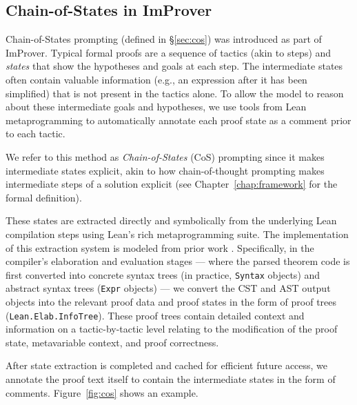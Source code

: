 \subsection{Chain-of-States in ImProver}
\label{ssec:improver_cos}

Chain-of-States prompting (defined in \S\ref{sec:cos}) was introduced as part of ImProver. Typical formal proofs are a sequence of tactics (akin to steps) and \textit{states} that show the hypotheses and goals at each step. The intermediate states often contain valuable information (e.g., an expression after it has been simplified) that is not present in the tactics alone. To allow the model to reason about these intermediate goals and hypotheses, we use tools from Lean metaprogramming to automatically annotate each proof state as a comment prior to each tactic.

We refer to this method as \textit{Chain-of-States} (CoS) prompting since it makes intermediate states explicit, akin to how chain-of-thought prompting \cite{wei2022chain} makes intermediate steps of a solution explicit (see Chapter~\ref{chap:framework} for the formal definition).

These states are extracted directly and symbolically from the underlying Lean compilation steps using Lean's rich metaprogramming suite. The implementation of this extraction system is modeled from prior work \cite{Trainingdata}. Specifically, in the compiler's elaboration and evaluation stages --- where the parsed theorem code is first converted into concrete syntax trees (in practice, \texttt{Syntax} objects) and abstract syntax trees (\texttt{Expr} objects) --- we convert the CST and AST output objects into the relevant proof data and proof states in the form of proof trees (\texttt{Lean.Elab.InfoTree}). These proof trees contain detailed context and information on a tactic-by-tactic level relating to the modification of the proof state, metavariable context, and proof correctness.

After state extraction is completed and cached for efficient future access, we annotate the proof text itself to contain the intermediate states in the form of comments. Figure~\ref{fig:cos} shows an example.

